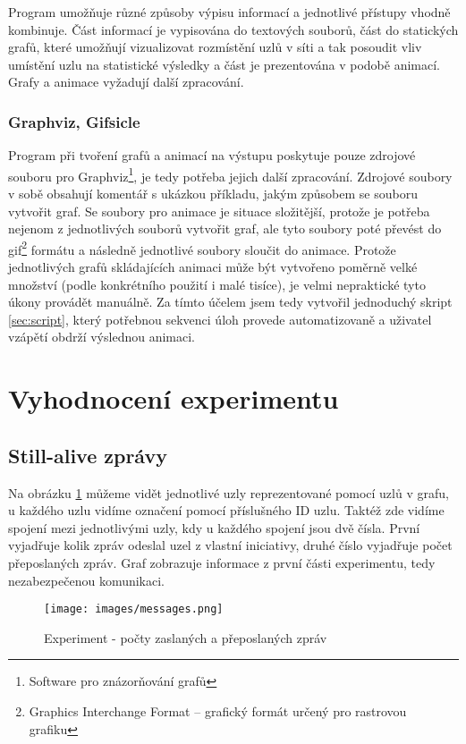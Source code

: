 \documentclass[11pt,final,twoside]{fithesis2}
\begin{document}
Program umožňuje různé způsoby výpisu informací a jednotlivé přístupy vhodně kombinuje. Část informací je vypisována do textových souborů, část do statických grafů, které umožňují vizualizovat 
rozmístění uzlů v síti a tak posoudit vliv umístění uzlu na statistické výsledky a část je prezentována v podobě animací. Grafy a animace vyžadují další zpracování.

\subsubsection{Graphviz, Gifsicle}

Program při tvoření grafů a animací na výstupu poskytuje pouze zdrojové souboru pro Graphviz\footnote{Software pro znázorňování grafů}, je tedy potřeba jejich další zpracování. Zdrojové soubory 
v sobě obsahují komentář s ukázkou příkladu, jakým způsobem se souboru vytvořit graf. Se soubory pro animace je situace složitější, protože je potřeba nejenom z jednotlivých souborů vytvořit graf, ale 
tyto soubory poté převést do gif\footnote{Graphics Interchange Format --  grafický formát určený pro rastrovou grafiku} formátu a následně jednotlivé soubory sloučit do animace. Protože jednotlivých
grafů skládajících animaci může být vytvořeno poměrně velké množství (podle konkrétního použití i malé tisíce), je velmi nepraktické tyto úkony provádět manuálně. Za tímto účelem jsem tedy vytvořil 
jednoduchý skript \ref{sec:script}, který potřebnou sekvenci úloh provede automatizovaně a uživatel vzápětí obdrží výslednou animaci. 

\section{Vyhodnocení experimentu}

\subsection{Still-alive zprávy} \label{sub:alive}

Na obrázku \ref{img:msgs} můžeme vidět jednotlivé uzly reprezentované pomocí uzlů v grafu, u každého uzlu vidíme označení pomocí příslušného ID uzlu. Taktéž zde vidíme spojení mezi jednotlivými uzly, kdy u 
každého spojení jsou dvě čísla. První vyjadřuje kolik zpráv odeslal uzel z vlastní iniciativy, druhé číslo vyjadřuje počet přeposlaných zpráv. Graf zobrazuje informace z první části experimentu, tedy
nezabezpečenou komunikaci. 

\begin{figure}[h]
     \centering
     \texttt{[image: images/messages.png]}
     \caption{Experiment - počty zaslaných a přeposlaných zpráv}
     \label{img:msgs}
\end{figure}
\end{document}
